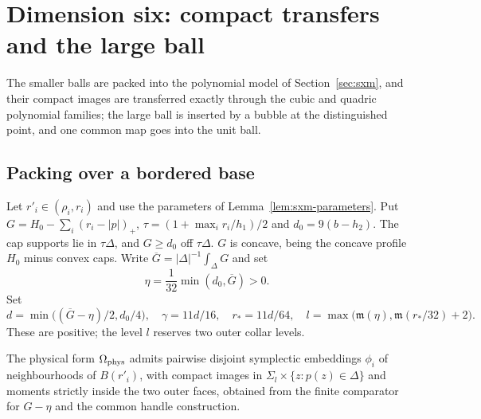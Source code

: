 \section{Dimension six: compact transfers and the large ball}\label{sec:sxr}

The smaller balls are packed into the polynomial model of Section~\ref{sec:sxm}, and their compact
images are transferred exactly through the cubic and quadric polynomial families; the large ball
is inserted by a bubble at the distinguished point, and one common map goes into the unit ball.

\subsection{Packing over a bordered base}\label{sec:sxr-minorant}

Let $r'_i\in(\rho_i,r_i)$ and use the parameters of Lemma~\ref{lem:sxm-parameters}.
Put $G=H_0-\sum_i(r_i-|p|)_+$, $\tau=(1+\max_i r_i/h_1)/2$ and $d_0=9(b-h_2)$.
The cap supports lie in $\tau\Delta$, and $G\ge d_0$ off $\tau\Delta$. $G$ is concave, being the
concave profile $H_0$ minus convex caps. Write $\overline G=|\Delta|^{-1}\int_\Delta G$ and set
\[
 \eta=\frac1{32}\min(d_0,\overline G)>0.
\]
Set
\[
 d=\min\bigl((\overline G-\eta)/2,d_0/4\bigr),\quad
 \gamma=11d/16,\quad r_*=11d/64,\quad
 l=\max\bigl(\mathfrak m(\eta),\mathfrak m(r_*/32)+2\bigr).
\]
These are positive; the level $l$ reserves two outer collar levels.

\begin{proposition}\label{prop:sxr-minorant}
The physical form $\Omega_{\rm phys}$ admits pairwise disjoint symplectic embeddings $\phi_i$ of
neighbourhoods of $B(r'_i)$, with compact images in $\Sigma_l\times\{z:p(z)\in\Delta\}$ and
moments strictly inside the two outer faces, obtained from the finite comparator for $G-\eta$
and the common handle construction.
\end{proposition}

